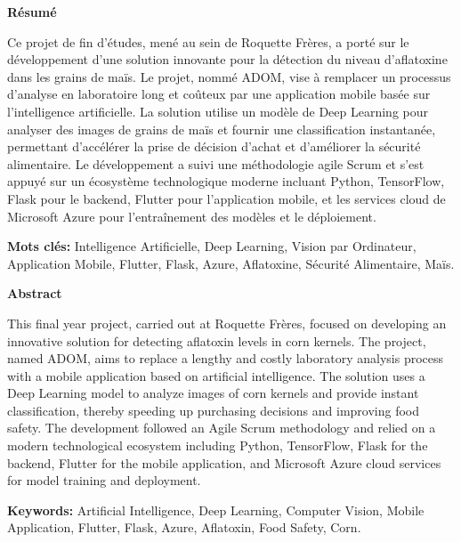 \documentclass[12pt,a4paper]{report}
\begin{document}
\cleardoublepage
{}
\vspace*{1.5cm}
\begin{center}
    {\Large\bfseries Résumé}\par
    \vspace{1.2cm}
    \begin{minipage}{0.85\linewidth}
    \justifying
    Ce projet de fin d’études, mené au sein de Roquette Frères, a porté sur le développement d'une solution innovante pour la détection du niveau d'aflatoxine dans les grains de maïs. Le projet, nommé ADOM, vise à remplacer un processus d'analyse en laboratoire long et coûteux par une application mobile basée sur l'intelligence artificielle. La solution utilise un modèle de Deep Learning pour analyser des images de grains de maïs et fournir une classification instantanée, permettant d'accélérer la prise de décision d'achat et d'améliorer la sécurité alimentaire. Le développement a suivi une méthodologie agile Scrum et s'est appuyé sur un écosystème technologique moderne incluant Python, TensorFlow, Flask pour le backend, Flutter pour l'application mobile, et les services cloud de Microsoft Azure pour l'entraînement des modèles et le déploiement.
    \vspace{2cm}
    \par
    \textbf{Mots clés:} Intelligence Artificielle, Deep Learning, Vision par Ordinateur, Application Mobile, Flutter, Flask, Azure, Aflatoxine, Sécurité Alimentaire, Maïs.
    \end{minipage}
\end{center}
\clearpage

\cleardoublepage
{}
\vspace*{1.5cm}
\begin{center}
    {\Large\bfseries Abstract}\par
    \vspace{1.2cm}
    \begin{minipage}{0.85\linewidth}
    \justifying
    This final year project, carried out at Roquette Frères, focused on developing an innovative solution for detecting aflatoxin levels in corn kernels. The project, named ADOM, aims to replace a lengthy and costly laboratory analysis process with a mobile application based on artificial intelligence. The solution uses a Deep Learning model to analyze images of corn kernels and provide instant classification, thereby speeding up purchasing decisions and improving food safety. The development followed an Agile Scrum methodology and relied on a modern technological ecosystem including Python, TensorFlow, Flask for the backend, Flutter for the mobile application, and Microsoft Azure cloud services for model training and deployment.
    \vspace{2cm}
    \par
    \textbf{Keywords:} Artificial Intelligence, Deep Learning, Computer Vision, Mobile Application, Flutter, Flask, Azure, Aflatoxin, Food Safety, Corn.
    \end{minipage}
\end{center}
\clearpage
\end{document}
